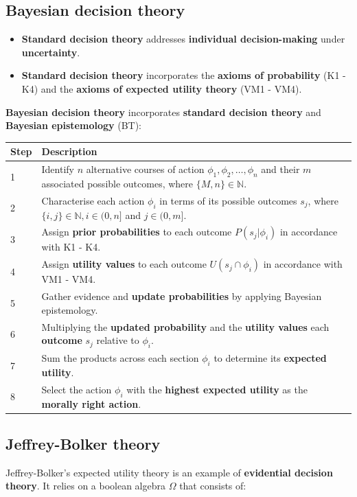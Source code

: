\documentclass[11pt]{article}
\begin{document}
 \newpage
\subsection{Bayesian decision theory}
\label{sec:org30caa27}
\begin{itemize}
\item \textbf{Standard decision theory} addresses \textbf{individual decision-making} under \textbf{uncertainty}.
\item \textbf{Standard decision theory} incorporates the \textbf{axioms of probability} (K1 - K4) and the \textbf{axioms of expected utility theory} (VM1 - VM4).
\end{itemize}

\textbf{Bayesian decision theory} incorporates \textbf{standard decision theory} and \textbf{Bayesian epistemology} (BT):
\begin{center}
\begin{tabular}{|m{2em}|m{28em}|}
\hline
Step & Description\\
\hline
1 & Identify \(n\) alternative courses of action \(\phi_1, \phi_2, \ldots, \phi_n\) and their \(m\) associated possible outcomes, where \(\{M, n\} \in \mathbb{N}\).\\
\hline
2 & Characterise each action \(\phi_i\) in terms of its possible outcomes \(s_j\), where \(\{i, j\} \in \mathbb{N}, i \in (0, n]\) and \(j \in (0, m]\).\\
\hline
3 & Assign \textbf{prior probabilities} to each outcome \(P(s_j \vert \phi_i)\) in accordance with K1 - K4.\\
\hline
4 & Assign \textbf{utility values} to each outcome \(U(s_j \cap \phi_i)\) in accordance with VM1 - VM4.\\
\hline
5 & Gather evidence and \textbf{update probabilities} by applying Bayesian epistemology.\\
\hline
6 & Multiplying the \textbf{updated probability} and the \textbf{utility values} each \textbf{outcome} \(s_j\) relative to \(\phi_i\).\\
\hline
7 & Sum the products across each section \(\phi_i\) to determine its \textbf{expected utility}.\\
\hline
8 & Select the action \(\phi_i\) with the \textbf{highest expected utility} as the \textbf{morally right action}.\\
\hline
\end{tabular}
\end{center}
\subsection{Jeffrey-Bolker theory}
\label{sec:org4fe6947}
Jeffrey-Bolker's expected utility theory is an example of \textbf{evidential decision theory}. It relies on a boolean algebra \(\Omega\) that consists of:
\end{document}
